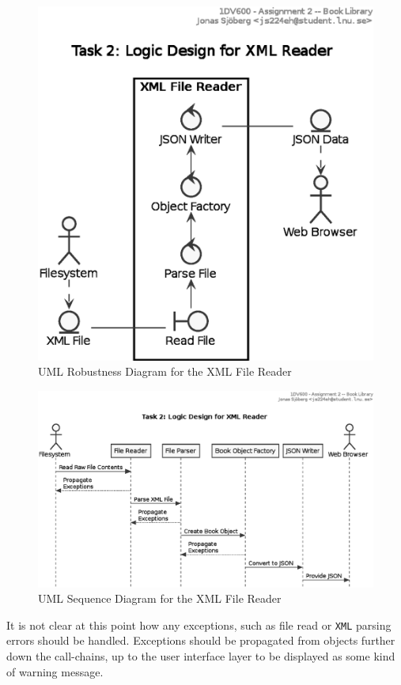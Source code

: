 \begin{figure}[htbp]
  \centering
  \includegraphics[width=0.75\linewidth]{include/uml-xml-design-rob.eps}
  \caption{UML Robustness Diagram for the XML File Reader}
  \label{fig:uml-xmlrob}
\end{figure}

\begin{figure}[htbp]
  \centering
  \includegraphics[width=1\linewidth]{include/uml-xml-design-seq.eps}
  \caption{UML Sequence Diagram for the XML File Reader}
  \label{fig:uml-xmlseq}
\end{figure}


It is not clear at this point how any exceptions, such as file read or
\texttt{XML} parsing errors should be handled. Exceptions should be propagated
from objects further down the call-chains, up to the user interface layer to be
displayed as some kind of warning message.



